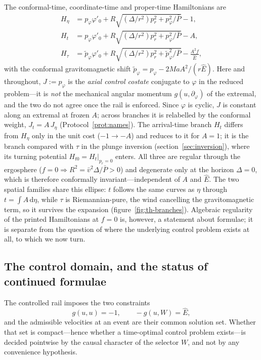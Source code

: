 \documentclass[12pt]{iopart}
\theoremstyle{plain}
\theoremstyle{definition}
\theoremstyle{remark}
\newcommand{\Ehat}{\hat E}
\newcommand{\dd}{\mathrm{d}}
\begin{document}
The conformal-time, coordinate-time and proper-time Hamiltonians are
\begin{align}
    H_\eta&=p_\varphi\varphi'_0
        +R\sqrt{(\Delta/r^2)p_r^2+p_\varphi^2/\bar P}-1,
    \label{eq:Heta}\\
    H_t&=p_\varphi\varphi'_0
        +R\sqrt{(\Delta/r^2)p_r^2+p_\varphi^2/\bar P}-A,
    \label{eq:Ht-tk}\\
    H_\tau&=\tilde p_\varphi\varphi'_0
        +R\sqrt{(\Delta/r^2)p_r^2+\tilde p_\varphi^2/\bar P}-\frac{A^2 f}{\Ehat},
    \label{eq:Htau-tk}
\end{align}
with the conformal gravitomagnetic shift
$\tilde p_\varphi=p_\varphi-2MaA^2/(r\Ehat)$. Here and throughout, $J:=p_\varphi$
is the \emph{axial control costate} conjugate to $\varphi$ in the reduced
problem---it is \emph{not} the mechanical angular momentum $g(u,\partial_\varphi)$
of the extremal, and the two do not agree once the rail is enforced. Since
$\varphi$ is cyclic, $J$ is constant along an extremal at frozen $A$; across
branches it is relabelled by the conformal weight, $J_t=A\,J_\eta$
(Protocol~\ref{prot:names}). The arrival-time branch $H_t$ differs
from $H_\eta$ only in the unit cost ($-1\to-A$) and reduces to it for $A=1$; it is
the branch compared with $\tau$ in the plunge inversion
(section~\ref{sec:inversion}), where its turning potential
$H_{t0}=H_t|_{p_r=0}$ enters. All three are regular through the
ergosphere ($f=0\Rightarrow R^2=\bar v^2\Delta/\bar P>0$) and degenerate only at
the horizon $\Delta=0$, which is therefore conformally invariant---independent of
$A$ and $\Ehat$. The two spatial families share this ellipse: $t$ follows the same
curves as $\eta$ through $t=\int A\,\dd\eta$, while $\tau$ is Riemannian-pure, the
wind cancelling the gravitomagnetic term, so it survives the expansion
(figure~\ref{fig:th-branches}). Algebraic regularity of the printed Hamiltonians
at $f=0$ is, however, a statement about formulae; it is separate from the
question of where the underlying control problem exists at all, to which we now
turn.

\subsection{The control domain, and the status of continued formulae}
\label{sec:domain}
The controlled rail imposes the two constraints
\begin{equation}
    g(u,u)=-1,\qquad -g(u,W)=\Ehat ,
    \label{eq:rail-constraints}
\end{equation}
and the admissible velocities at an event are their common solution set. Whether
that set is compact---hence whether a time-optimal control problem exists---is
decided pointwise by the causal character of the selector $W$, and not by any
convenience hypothesis.
\end{document}
